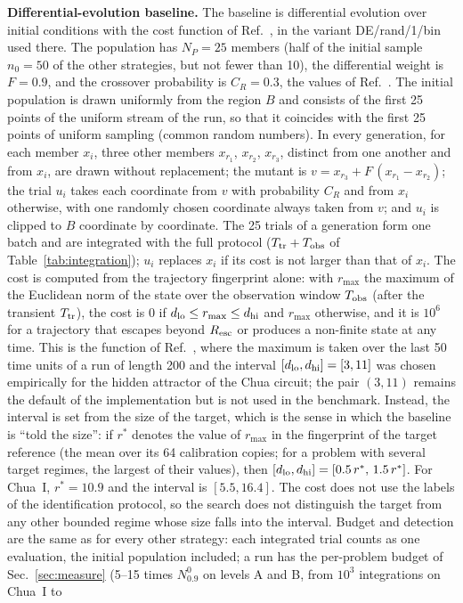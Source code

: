 
\textbf{Differential-evolution baseline.} The baseline is differential evolution over initial conditions with the cost function of Ref.~, in the variant DE/rand/1/bin used there. The population has $N_P=25$ members (half of the initial sample $n_0=50$ of the other strategies, but not fewer than 10), the differential weight is $F=0.9$, and the crossover probability is $C_R=0.3$, the values of Ref.~. The initial population is drawn uniformly from the region $B$ and consists of the first 25 points of the uniform stream of the run, so that it coincides with the first 25 points of uniform sampling (common random numbers). In every generation, for each member $x_i$, three other members $x_{r_1}$, $x_{r_2}$, $x_{r_3}$, distinct from one another and from $x_i$, are drawn without replacement; the mutant is $v=x_{r_3}+F\,(x_{r_1}-x_{r_2})$; the trial $u_i$ takes each coordinate from $v$ with probability $C_R$ and from $x_i$ otherwise, with one randomly chosen coordinate always taken from $v$; and $u_i$ is clipped to $B$ coordinate by coordinate. The 25 trials of a generation form one batch and are integrated with the full protocol ($T_{\rm tr}+T_{\rm obs}$ of Table~\ref{tab:integration}); $u_i$ replaces $x_i$ if its cost is not larger than that of $x_i$. The cost is computed from the trajectory fingerprint alone: with $r_{\max}$ the maximum of the Euclidean norm of the state over the observation window $T_{\rm obs}$ (after the transient $T_{\rm tr}$), the cost is 0 if $d_{\rm lo}\le r_{\max}\le d_{\rm hi}$ and $r_{\max}$ otherwise, and it is $10^6$ for a trajectory that escapes beyond $R_{\rm esc}$ or produces a non-finite state at any time. This is the function of Ref.~, where the maximum is taken over the last 50 time units of a run of length 200 and the interval $[d_{\rm lo},d_{\rm hi}]=[3,11]$ was chosen empirically for the hidden attractor of the Chua circuit; the pair $(3,11)$ remains the default of the implementation but is not used in the benchmark. Instead, the interval is set from the size of the target, which is the sense in which the baseline is ``told the size'': if $r^\ast$ denotes the value of $r_{\max}$ in the fingerprint of the target reference (the mean over its 64 calibration copies; for a problem with several target regimes, the largest of their values), then $[d_{\rm lo},d_{\rm hi}]=[0.5\,r^\ast,\,1.5\,r^\ast]$. For Chua~I, $r^\ast=10.9$ and the interval is $[5.5,16.4]$. The cost does not use the labels of the identification protocol, so the search does not distinguish the target from any other bounded regime whose size falls into the interval. Budget and detection are the same as for every other strategy: each integrated trial counts as one evaluation, the initial population included; a run has the per-problem budget of Sec.~\ref{sec:measure} (5--15 times $N^0_{0.9}$ on levels A and B, from $10^3$ integrations on Chua~I to 